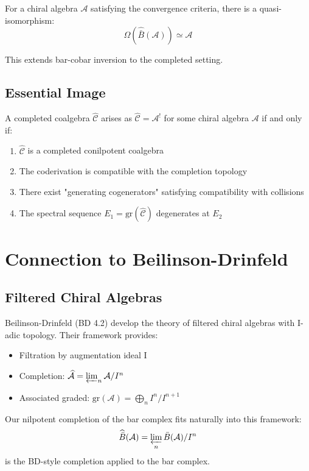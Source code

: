 \begin{theorem}\label{thm:completed-bar-cobar}
For a chiral algebra $\mathcal{A}$ satisfying the convergence criteria, there is a quasi-isomorphism:
$$\Omega(\widehat{\bar{B}}(\mathcal{A})) \simeq \mathcal{A}$$

This extends bar-cobar inversion to the completed setting.
\end{theorem}

\subsection{Essential Image}

\begin{theorem}\label{thm:koszul-dual-characterization}
A completed coalgebra $\widehat{\mathcal{C}}$ arises as $\widehat{\mathcal{C}} = \mathcal{A}^!$ for some chiral algebra $\mathcal{A}$ if and only if:
\begin{enumerate}
\item $\widehat{\mathcal{C}}$ is a completed conilpotent coalgebra
\item The coderivation is compatible with the completion topology
\item There exist "generating cogenerators" satisfying compatibility with collisions
\item The spectral sequence $E_1 = \text{gr}(\widehat{\mathcal{C}})$ degenerates at $E_2$
\end{enumerate}
\end{theorem}

\section{Connection to Beilinson-Drinfeld}

\subsection{Filtered Chiral Algebras}

\begin{remark}[BD Framework]\label{rem:BD-filtered}
Beilinson-Drinfeld (BD 4.2) develop the theory of filtered chiral algebras with I-adic topology. Their framework provides:

\begin{itemize}
\item Filtration by augmentation ideal I
\item Completion: $\widehat{\mathcal{A}} = \varprojlim_n \mathcal{A}/I^n$
\item Associated graded: $\text{gr}(\mathcal{A}) = \bigoplus_n I^n/I^{n+1}$
\end{itemize}

Our nilpotent completion of the bar complex fits naturally into this framework:
$$\widehat{\bar{B}}(\mathcal{A}) = \varprojlim_n \bar{B}(\mathcal{A})/I^n$$
is the BD-style completion applied to the bar complex.
\end{remark}

